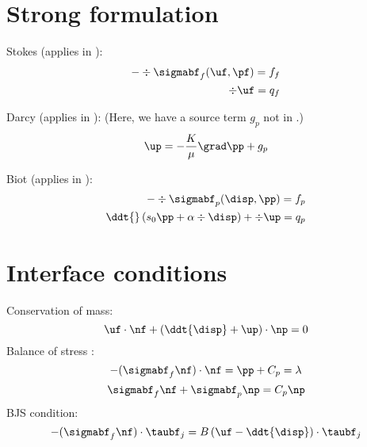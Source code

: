 \documentclass{article}
\begin{document}
\section{Strong formulation}

Stokes (applies in \stokes):
\begin{subequations}
  \begin{align}
    - \div \sigmabf_f (\uf, \pf) = f_f    \label{eq:stokes_stress} \\
    \div \uf = q_f    \label{eq:stokes_conservation}
  \end{align}
\end{subequations}

Darcy (applies in \darcy):
(Here, we have a source term $g_p$ not in \cite{ambartsumyan}.)
\begin{equation}
    \up = - \frac {K} {\mu} \grad \pp + g_p     \label{eq:darcy}
  \end{equation}

  
Biot (applies in \darcy):
\begin{subequations}
  \begin{align}
    - \div \sigmabf_p (\disp, \pp) = f_p     \label{eq:biot_stress} \\
    \ddt{} \left ( s_0 \pp + \alpha \div \disp \right ) + \div \up = q_p    \label{eq:biot_conservation}
  \end{align}
\end{subequations}
\section{Interface conditions}

Conservation of mass:
\begin{equation}
\uf  \cdot \nf + \left ( \ddt{\disp} + \up \right ) \cdot \np = 0  \label{eq:massconservation}
\end{equation}
Balance of stress :
\begin{equation}
  -(\sigmabf_f \nf) \cdot \nf = \pp + C_p = \lambda  \label{eq:stressbalance1_mult}
\end{equation}
\begin{equation}
  \sigmabf_f \nf + \sigmabf_p \np = C_p \np \label{eq:stressbalance2}
\end{equation}
BJS condition:
\begin{equation}
  -(\sigmabf_f \nf) \cdot \taubf_j = B \left ( \uf - \ddt{\disp} \right ) \cdot \taubf_j
  \label{eq:BJS}
\end{equation}
\end{document}
